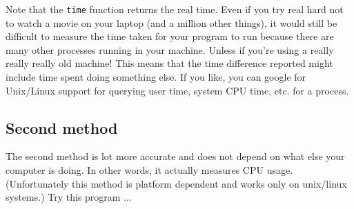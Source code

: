Note that the \verb!time! function returns the real time.
Even if you try real hard not to watch a movie on your laptop
(and a million other things), 
it would still be difficult to measure the time
taken for your program to run because
there are many other processes running in your machine.
Unless if you're using a really really really old machine!
This means that the time difference reported might include time spent doing
something else.
If you like, you can google for Unix/Linux support for querying 
user time, system CPU time, etc. for a process.

\subsection{Second method}

The second method is lot more accurate and does not depend on
what else your computer is doing.
In other words, it actually measures CPU usage.
(Unfortunately this method is platform dependent and works only on
unix/linux systems.)
Try this program ...


